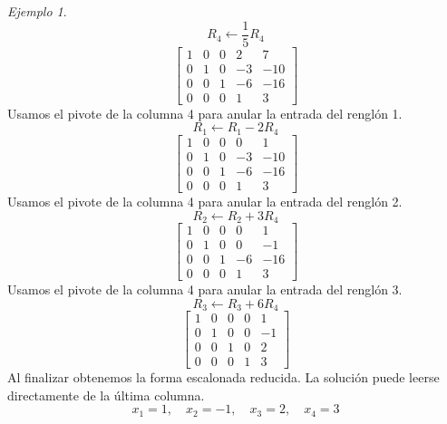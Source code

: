 \documentclass[12pt]{article}
\theoremstyle{remark}
\newtheorem{Ejem}[definicion]{Ejemplo}
\begin{document}
\begin{Ejem}
\[
R_{4}\leftarrow \frac{1}{5}R_{4}
\]
\[
\left[\begin{array}{cccc|c}
1 & 0 & 0 & 2 & 7\\
0 & 1 & 0 & -3 & -10\\
0 & 0 & 1 & -6 & -16\\
0 & 0 & 0 & 1 & 3
\end{array}\right]
\]
 Usamos el pivote de la columna 4 para anular la entrada del renglón 1.
\[
R_{1}\leftarrow R_{1}-2R_{4}
\]
\[
\left[\begin{array}{cccc|c}
1 & 0 & 0 & 0 & 1\\
0 & 1 & 0 & -3 & -10\\
0 & 0 & 1 & -6 & -16\\
0 & 0 & 0 & 1 & 3
\end{array}\right]
\]
Usamos el pivote de la columna 4 para anular la entrada del renglón 2.
\[
R_{2}\leftarrow R_{2}+3R_{4}
\]
\[
\left[\begin{array}{cccc|c}
1 & 0 & 0 & 0 & 1\\
0 & 1 & 0 & 0 & -1\\
0 & 0 & 1 & -6 & -16\\
0 & 0 & 0 & 1 & 3
\end{array}\right]
\]
Usamos el pivote de la columna 4 para anular la entrada del renglón 3.
\[
R_{3}\leftarrow R_{3}+6R_{4}
\]
\[
\left[\begin{array}{cccc|c}
1 & 0 & 0 & 0 & 1\\
0 & 1 & 0 & 0 & -1\\
0 & 0 & 1 & 0 & 2\\
0 & 0 & 0 & 1 & 3
\end{array}\right]
\]
Al finalizar obtenemos la forma escalonada reducida. La solución puede leerse directamente de la última columna.
\[
\boxed{x_{1}=1,\quad x_{2}=-1,\quad x_{3}=2,\quad x_{4}=3}
\]

\end{Ejem}
\end{document}
